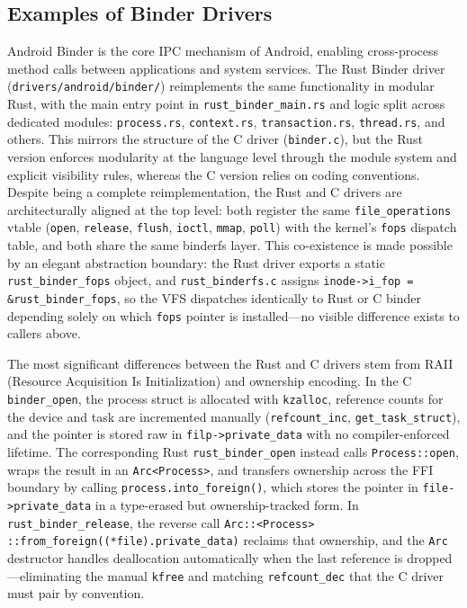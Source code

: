 \subsection{Examples of Binder Drivers}



Android Binder is the core IPC mechanism of Android, enabling cross-process method calls between applications and system services.
The Rust Binder driver (\texttt{drivers/android/binder/}) reimplements the same functionality in modular Rust, with the main entry point in \texttt{rust\_binder\_main.rs} and logic split across dedicated modules: \texttt{process.rs}, \texttt{context.rs}, \texttt{transaction.rs}, \texttt{thread.rs}, and others.
This mirrors the structure of the C driver (\texttt{binder.c}), but the Rust version enforces modularity at the language level through the module system and explicit visibility rules, whereas the C version relies on coding conventions.
Despite being a complete reimplementation, the Rust and C drivers are architecturally aligned at the top level: both register the same \texttt{file\_operations} vtable (\texttt{open}, \texttt{release}, \texttt{flush}, \texttt{ioctl}, \texttt{mmap}, \texttt{poll}) with the kernel's \texttt{fops} dispatch table, and both share the same binderfs layer.
This co-existence is made possible by an elegant abstraction boundary: the Rust driver exports a static \texttt{rust\_binder\_fops} object, and \texttt{rust\_binderfs.c} assigns \texttt{inode->i\_fop = \&rust\_binder\_fops}, so the VFS dispatches identically to Rust or C binder depending solely on which \texttt{fops} pointer is installed---no visible difference exists to callers above.

The most significant differences between the Rust and C drivers stem from RAII (Resource Acquisition Is Initialization) and ownership encoding.
In the C \texttt{binder\_open}, the process struct is allocated with \texttt{kzalloc}, reference counts for the device and task are incremented manually (\texttt{refcount\_inc}, \texttt{get\_task\_struct}), and the pointer is stored raw in \texttt{filp->private\_data} with no compiler-enforced lifetime.
The corresponding Rust \texttt{rust\_binder\_open} instead calls \texttt{Process::open}, wraps the result in an \texttt{Arc<Process>}, and transfers ownership across the FFI boundary by calling \texttt{process.into\_foreign()}, which stores the pointer in \texttt{file->private\_data} in a type-erased but ownership-tracked form.
In \texttt{rust\_binder\_release}, the reverse call \texttt{Arc::<Process>}
\texttt{::from\_foreign((*file).private\_data)} reclaims that ownership, and the \texttt{Arc} destructor handles deallocation automatically when the last reference is dropped---eliminating the manual \texttt{kfree} and matching \texttt{refcount\_dec} that the C driver must pair by convention.

